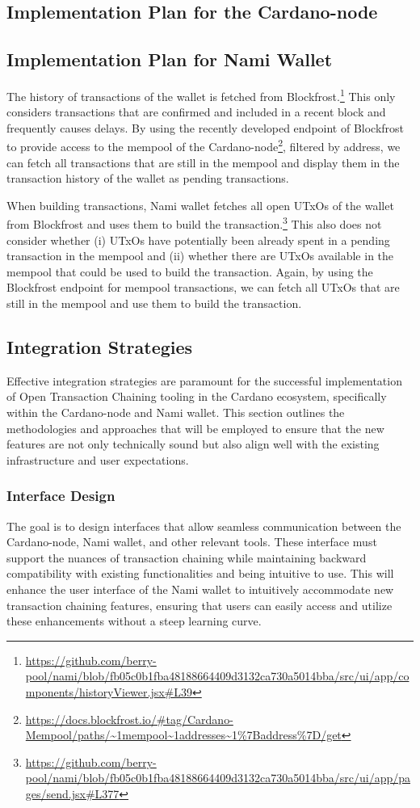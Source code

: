 \documentclass[11pt]{article}
\begin{document}
\subsection{Implementation Plan for the Cardano-node}
\subsection{Implementation Plan for Nami Wallet}

The history of transactions of the wallet is fetched from Blockfrost.\footnote{\url{https://github.com/berry-pool/nami/blob/fb05c0b1fba48188664409d3132ca730a5014bba/src/ui/app/components/historyViewer.jsx\#L39}}
This only considers transactions that are confirmed and included in a recent block and frequently causes delays.
By using the recently developed endpoint of Blockfrost to provide access to the mempool of the Cardano-node\footnote{\url{https://docs.blockfrost.io/\#tag/Cardano-Mempool/paths/~1mempool~1addresses~1\%7Baddress\%7D/get}},
filtered by address, we can fetch all transactions that are still in the mempool and display them in the transaction history of the wallet as pending transactions.

When building transactions, Nami wallet fetches all open UTxOs of the wallet from Blockfrost
and uses them to build the transaction.\footnote{\url{https://github.com/berry-pool/nami/blob/fb05c0b1fba48188664409d3132ca730a5014bba/src/ui/app/pages/send.jsx\#L377}}
This also does not consider whether (i) UTxOs have potentially been already spent in a pending transaction in the mempool and
(ii) whether there are UTxOs available in the mempool that could be used to build the transaction.
Again, by using the Blockfrost endpoint for mempool transactions, we can fetch all UTxOs that are still in the mempool and use them to build the transaction.

\subsection{Integration Strategies}

Effective integration strategies are paramount for the successful implementation of Open Transaction Chaining tooling in the Cardano ecosystem,
specifically within the Cardano-node and Nami wallet.
This section outlines the methodologies and approaches that will be employed to ensure that the new features are not only technically sound but also align well with the existing infrastructure and user expectations.

\subsubsection{Interface Design}
The goal is to design interfaces that allow seamless communication between the Cardano-node, Nami wallet, and other relevant tools.
These interface must support the nuances of transaction chaining while maintaining backward compatibility with existing functionalities and being intuitive to use.
This will enhance the user interface of the Nami wallet to intuitively accommodate new transaction chaining features, ensuring that users can easily access and utilize these enhancements without a steep learning curve.
\end{document}
